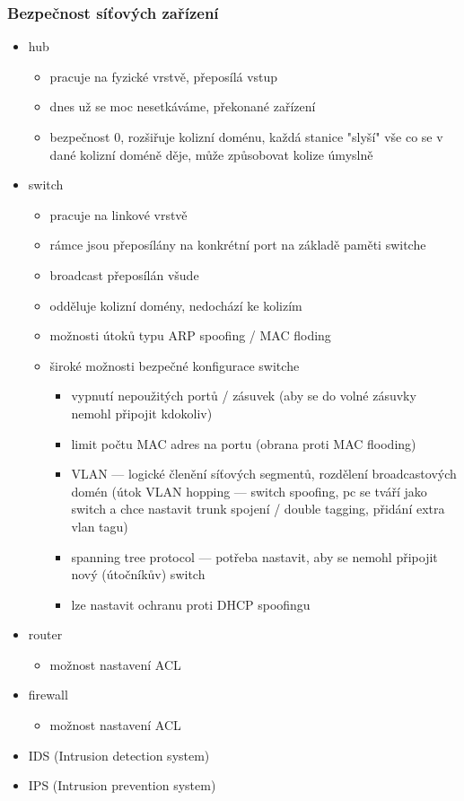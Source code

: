 \subsubsection*{Bezpečnost síťových zařízení}
\begin{itemize}
	\item hub
	\begin{itemize}
	\item pracuje na fyzické vrstvě, přeposílá vstup
		\item dnes už se moc nesetkáváme, překonané zařízení
		\item bezpečnost 0, rozšiřuje kolizní doménu, každá stanice "slyší" vše co se v dané kolizní doméně děje, může způsobovat kolize úmyslně
	\end{itemize}
	\item switch
	\begin{itemize}
		\item pracuje na linkové vrstvě
		\item rámce jsou přeposílány na konkrétní port na základě paměti switche
		\item broadcast přeposílán všude
		\item odděluje kolizní domény, nedochází ke kolizím
		\item možnosti útoků typu ARP spoofing  / MAC floding
		\item široké možnosti bezpečné konfigurace switche
		\begin{itemize}
			\item vypnutí nepoužitých portů / zásuvek (aby se do volné zásuvky nemohl připojit kdokoliv)
			\item limit počtu MAC adres na portu (obrana proti MAC flooding)
			\item VLAN --- logické členění síťových segmentů, rozdělení broadcastových domén (útok VLAN hopping --- switch spoofing, pc se tváří jako switch a chce nastavit trunk spojení / double tagging, přidání extra vlan tagu)
			\item spanning tree protocol --- potřeba nastavit, aby se nemohl připojit nový (útočníkův) switch
			\item lze nastavit ochranu proti DHCP spoofingu
		\end{itemize}
	\end{itemize}
	\item router
	\begin{itemize}
		\item možnost nastavení ACL
	\end{itemize}
	\item firewall
	\begin{itemize}
		\item možnost nastavení ACL
	\end{itemize}
	\item IDS (Intrusion detection system)
	\item IPS (Intrusion prevention system)
\end{itemize}